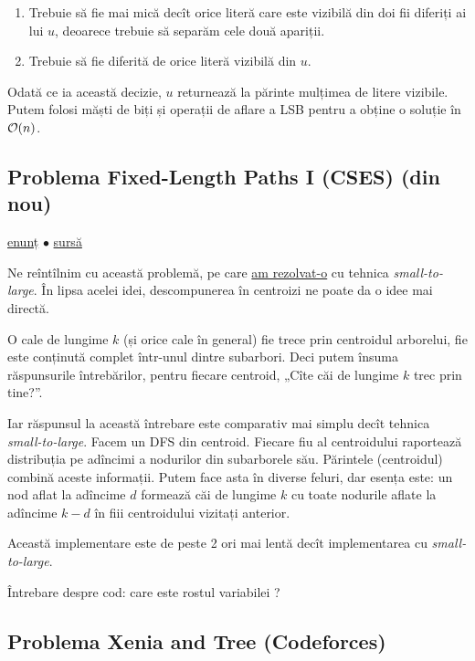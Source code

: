 \documentclass[../main.tex]{subfiles}
\begin{document}
\begin{enumerate}
  \item Trebuie să fie mai mică decît orice literă care este vizibilă din doi fii diferiți ai lui $u$, deoarece trebuie să separăm cele două apariții.
  \item Trebuie să fie diferită de orice literă vizibilă din $u$.
\end{enumerate}

Odată ce ia această decizie, $u$ returnează la părinte mulțimea de litere vizibile. Putem folosi măști de biți și operații de aflare a LSB pentru a obține o soluție în $\mathcal{O}(n)$.

\subsection{Problema Fixed-Length Paths I (CSES) (din nou)}
\label{problem:fixed-length-paths-1-centroid}

\href{https://cses.fi/problemset/task/2080}{enunț}
$\bullet$
\hyperref[code:fixed-length-paths-1-centroid]{sursă}

Ne reîntîlnim cu această problemă, pe care \hyperref[problem:fixed-length-paths-1]{am rezolvat-o} cu tehnica \textit{small-to-large}. În lipsa acelei idei, descompunerea în centroizi ne poate da o idee mai directă.

O cale de lungime $k$ (și orice cale în general) fie trece prin centroidul arborelui, fie este conținută complet într-unul dintre subarbori. Deci putem însuma răspunsurile întrebărilor, pentru fiecare centroid, „Cîte căi de lungime $k$ trec prin tine?”.

Iar răspunsul la această întrebare este comparativ mai simplu decît tehnica \textit{small-to-large}. Facem un DFS din centroid. Fiecare fiu al centroidului raportează distribuția pe adîncimi a nodurilor din subarborele său. Părintele (centroidul) combină aceste informații. Putem face asta în diverse feluri, dar esența este: un nod aflat la adîncime $d$ formează căi de lungime $k$ cu toate nodurile aflate la adîncime $k-d$ în fiii centroidului vizitați anterior.

Această implementare este de peste 2 ori mai lentă decît implementarea cu \textit{small-to-large}.

Întrebare despre cod: care este rostul variabilei ?

\subsection{Problema Xenia and Tree (Codeforces)}
\label{problem:xenia-and-tree}
\end{document}
